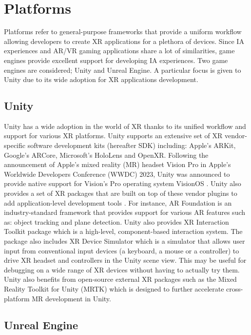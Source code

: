 \documentclass{vgtc}                          %
\begin{document}
\section{Platforms}

Platforms refer to general-purpose frameworks that provide a uniform workflow
allowing developers to create XR applications for a plethora of devices. Since
IA experiences and AR/VR gaming applications share a lot of similarities, game
engines provide excellent support for developing IA experiences. Two game
engines are considered; Unity and Unreal Engine. A particular focus is given
to Unity due to its wide adoption for XR applications development.

\subsection{Unity}
Unity has a wide adoption in the world of XR thanks to its unified workflow
and support for various XR platforms. Unity supports an extensive set of XR
vendor-specific software development kits (hereafter SDK) including: Apple's
ARKit, Google's ARCore, Microsoft's HoloLens and OpenXR. Following the
announcement of Apple's mixed reality (MR) headset Vision Pro in Apple's
Worldwide Developers Conference (WWDC) 2023, Unity was announced to provide
native support for Vision's Pro operating system VisionOS \cite{web:vision_pro_unity}.
Unity also provides a set of XR packages that are built on top of these vendor
plugins to add application-level development tools \cite{unity:xr_packages}.
For instance, AR Foundation is an industry-standard framework that provides
support for various AR features such as: object tracking and plane detection.
Unity also provides XR Interaction Toolkit package which is a high-level,
component-based interaction system. The package also includes XR Device
Simulator which is a simulator that allows user input from conventional input
devices (a keyboard, a mouse or a controller) to drive XR headset and
controllers in the Unity scene view. This may be useful for debugging on a
wide range of XR devices without having to actually try them. Unity also
benefits from open-source external XR packages such as the Mixed Reality
Toolkit for Unity (MRTK) \cite{mrtk:repo} which is designed to further accelerate cross-platform MR development in Unity.

\subsection{Unreal Engine}
\end{document}

